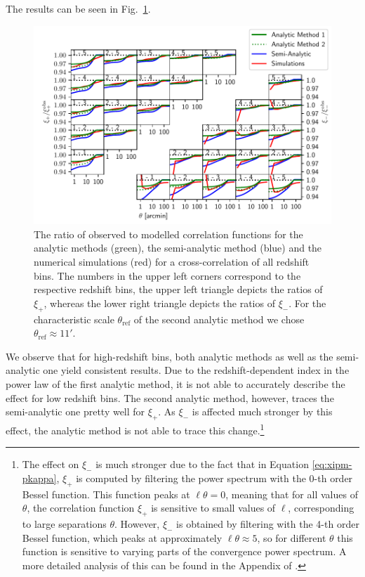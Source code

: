 \documentclass[referee]{aa} %
\renewcommand{\[}{\begin{equation}}
\renewcommand{\]}{\end{equation}}
\renewcommand{\rm}{\mathrm}
\begin{document}
The results can be seen in Fig.~\ref{fig:all_xis}.
	\begin{figure}
	\centering
	\includegraphics[width=1\textwidth]{images/xis_all1.pdf}
	\caption{The ratio of observed to modelled correlation functions for the analytic methods (green), the semi-analytic method (blue) and the numerical simulations (red) for a cross-correlation of all redshift bins. The numbers in the upper left corners correspond to the respective redshift bins, the upper left triangle depicts the ratios of $\xi_+$, whereas the lower right triangle depicts the ratios of $\xi_-$. For the characteristic scale $\theta_{\rm{ref}}$ of the second analytic method we chose $\theta_{\rm{ref}} \approx 11'$.}
	\label{fig:all_xis}
	\end{figure}
We observe that for high-redshift bins, both analytic methods as well as the semi-analytic one yield consistent results. Due to the redshift-dependent index in the power law of the first analytic method, it is not able to accurately describe the effect for low redshift bins. The second analytic method, however, traces the semi-analytic one pretty well for $\xi_+$. As $\xi_-$ is affected much stronger by this effect, the analytic method is not able to trace this change.\footnote{The effect on $\xi_-$ is much stronger due to the fact that in Equation \eqref{eq:xipm-pkappa}, $\xi_+$ is computed by filtering the power spectrum with the 0-th order Bessel function. This function peaks at $\ell\theta=0$, meaning that for all values of $\theta$, the correlation function $\xi_+$ is sensitive to small values of $\ell$, corresponding to large separations $\theta$. However, $\xi_-$ is obtained by filtering with the 4-th order Bessel function, which peaks at approximately $\ell\theta\approx 5$, so for different $\theta$ this function is sensitive to varying parts of the convergence power spectrum. A more detailed analysis of this can be found in the Appendix of \citet{2017MNRAS.471.4412K}.}
\end{document}

